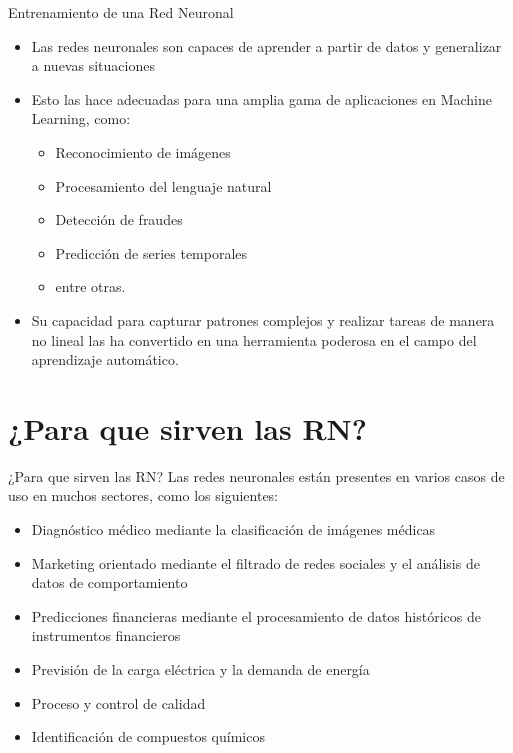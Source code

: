 \documentclass[11pt,aspectratio=169]{beamer}
\begin{document}
\begin{frame}{Entrenamiento de una Red Neuronal}
	\begin{itemize}
		\item Las redes neuronales son capaces de aprender a partir de datos y generalizar a nuevas situaciones\pause 
		\item Esto las hace adecuadas para una amplia gama de aplicaciones en Machine Learning, como:\pause
			\begin{itemize}
				\item Reconocimiento de imágenes \pause
				\item Procesamiento del lenguaje natural\pause
				\item Detección de fraudes\pause
				\item Predicción de series temporales \pause
				\item entre otras. \pause
			\end{itemize}
		\item Su capacidad para capturar patrones complejos y realizar tareas de manera no lineal las ha convertido en una herramienta 
		poderosa en el campo del aprendizaje automático.
	\end{itemize}
\end{frame}

\section{¿Para que sirven las RN?}
\begin{frame}{¿Para que sirven las RN?}
	Las redes neuronales están presentes en varios casos de uso en muchos sectores, como los siguientes:\pause
	\begin{itemize}
		\item Diagnóstico médico mediante la clasificación de imágenes médicas \pause
		\item Marketing orientado mediante el filtrado de redes sociales y el análisis de datos de comportamiento\pause
		\item Predicciones financieras mediante el procesamiento de datos históricos de instrumentos financieros\pause
		\item Previsión de la carga eléctrica y la demanda de energía\pause 
		\item Proceso y control de calidad\pause 
		\item Identificación de compuestos químicos
	\end{itemize}
\end{frame}
\end{document}
